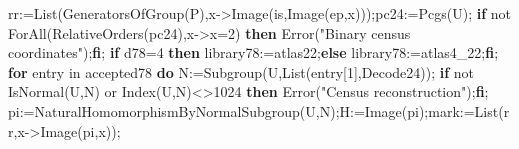 \documentclass[
  10pt,
  letterpaper,
]{article}
\newenvironment{Shaded}{}{}
\newcommand{\BuiltInTok}[1]{\textcolor[rgb]{0.00,0.50,0.00}{#1}}
\newcommand{\ConstantTok}[1]{\textcolor[rgb]{0.53,0.00,0.00}{#1}}
\newcommand{\ControlFlowTok}[1]{\textcolor[rgb]{0.00,0.44,0.13}{\textbf{#1}}}
\newcommand{\ExtensionTok}[1]{#1}
\newcommand{\FloatTok}[1]{\textcolor[rgb]{0.25,0.63,0.44}{#1}}
\newcommand{\NormalTok}[1]{#1}
\newcommand{\OperatorTok}[1]{\textcolor[rgb]{0.40,0.40,0.40}{#1}}
\newcommand{\StringTok}[1]{\textcolor[rgb]{0.25,0.44,0.63}{#1}}
\newcommand{\VariableTok}[1]{\textcolor[rgb]{0.10,0.09,0.49}{#1}}
\begin{document}
\begin{Shaded}
\begin{Highlighting}[]
 \VariableTok{rr}\OperatorTok{:=}\BuiltInTok{List}\NormalTok{(}\BuiltInTok{GeneratorsOfGroup}\NormalTok{(}\VariableTok{P}\NormalTok{)}\OperatorTok{,}\VariableTok{x}\OperatorTok{{-}\textgreater{}}\BuiltInTok{Image}\NormalTok{(}\VariableTok{is}\OperatorTok{,}\BuiltInTok{Image}\NormalTok{(}\VariableTok{ep}\OperatorTok{,}\VariableTok{x}\NormalTok{)))}\OperatorTok{;}\VariableTok{pc24}\OperatorTok{:=}\BuiltInTok{Pcgs}\NormalTok{(}\VariableTok{U}\NormalTok{)}\OperatorTok{;}
 \ControlFlowTok{if} \ConstantTok{not} \BuiltInTok{ForAll}\NormalTok{(}\BuiltInTok{RelativeOrders}\NormalTok{(}\VariableTok{pc24}\NormalTok{)}\OperatorTok{,}\VariableTok{x}\OperatorTok{{-}\textgreater{}}\VariableTok{x}\OperatorTok{=}\FloatTok{2}\NormalTok{) }\ControlFlowTok{then} \BuiltInTok{Error}\NormalTok{(}\StringTok{"Binary census coordinates"}\NormalTok{)}\OperatorTok{;}\ControlFlowTok{fi}\OperatorTok{;}
 \ControlFlowTok{if} \VariableTok{d78}\OperatorTok{=}\FloatTok{4} \ControlFlowTok{then} \VariableTok{library78}\OperatorTok{:=}\VariableTok{atlas22}\OperatorTok{;}\ControlFlowTok{else} \VariableTok{library78}\OperatorTok{:=}\VariableTok{atlas4\_22}\OperatorTok{;}\ControlFlowTok{fi}\OperatorTok{;}
 \ControlFlowTok{for} \VariableTok{entry} \ExtensionTok{in} \VariableTok{accepted78} \ControlFlowTok{do}
  \VariableTok{N}\OperatorTok{:=}\BuiltInTok{Subgroup}\NormalTok{(}\VariableTok{U}\OperatorTok{,}\BuiltInTok{List}\NormalTok{(}\VariableTok{entry}\NormalTok{[}\FloatTok{1}\NormalTok{]}\OperatorTok{,}\VariableTok{Decode24}\NormalTok{))}\OperatorTok{;}
  \ControlFlowTok{if} \ConstantTok{not} \BuiltInTok{IsNormal}\NormalTok{(}\VariableTok{U}\OperatorTok{,}\VariableTok{N}\NormalTok{) }\ConstantTok{or} \BuiltInTok{Index}\NormalTok{(}\VariableTok{U}\OperatorTok{,}\VariableTok{N}\NormalTok{)}\OperatorTok{\textless{}\textgreater{}}\FloatTok{1024} \ControlFlowTok{then} \BuiltInTok{Error}\NormalTok{(}\StringTok{"Census reconstruction"}\NormalTok{)}\OperatorTok{;}\ControlFlowTok{fi}\OperatorTok{;}
  \VariableTok{pi}\OperatorTok{:=}\BuiltInTok{NaturalHomomorphismByNormalSubgroup}\NormalTok{(}\VariableTok{U}\OperatorTok{,}\VariableTok{N}\NormalTok{)}\OperatorTok{;}\VariableTok{H}\OperatorTok{:=}\BuiltInTok{Image}\NormalTok{(}\VariableTok{pi}\NormalTok{)}\OperatorTok{;}\VariableTok{mark}\OperatorTok{:=}\BuiltInTok{List}\NormalTok{(}\VariableTok{rr}\OperatorTok{,}\VariableTok{x}\OperatorTok{{-}\textgreater{}}\BuiltInTok{Image}\NormalTok{(}\VariableTok{pi}\OperatorTok{,}\VariableTok{x}\NormalTok{))}\OperatorTok{;}

\end{Highlighting}
\end{Shaded}
\end{document}
